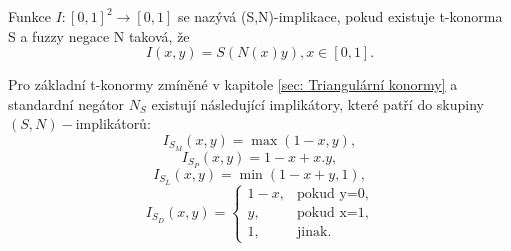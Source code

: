 \begin{definition}
    \cite{Springer}
    Funkce $I: [0,1]^2 \rightarrow [0,1]$ se nazývá (S,N)-implikace, pokud existuje t-konorma S a fuzzy negace N taková, že $$I(x,y) = S(N(x)y), x \in [0,1].$$
\end{definition}

\begin{example}
\cite{Springer}
Pro základní t-konormy zmíněné v kapitole \ref{sec: Triangulární konormy} a standardní negátor $N_S$ existují následující implikátory, které patří do skupiny $(S,N)-$implikátor\r u:\\
    \vbox{$$ I_{S_M}(x,y)=\max(1-x,y),$$ }
\vbox{$$ I_{S_P}(x,y)=1-x+x.y,$$}
 \vbox{$$ I_{S_L}(x,y)=\min(1-x+y,1),$$}
 $$ I_{S_D}(x,y)=\begin{cases} 1-x,
&\mbox {pokud y=0,} \\y, &\mbox {pokud x=1}, \\
1, &\mbox {jinak.} \end{cases} $$
\end{example}

